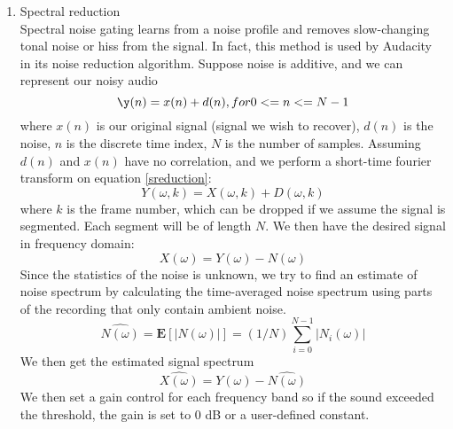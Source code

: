 \begin{enumerate}
	\item Spectral reduction\\
	Spectral noise gating learns from a noise profile and removes slow-changing tonal noise or hiss from the signal. In 
	fact, this method is used by Audacity in its noise reduction algorithm. \cite{audacity}
	Suppose noise is additive, and we can represent our noisy audio 
	\begin{equation} \label{sreduction}
	\y(n) = x(n) + d(n), for 0 <= n <= N-1 
	\end{equation}
	where $x(n)$ is our original signal (signal we wish to recover), $d(n)$ is the noise, $n$ is the discrete time index,
	$N$ is the number of samples. 
	Assuming $d(n)$ and $x(n)$ have no correlation, and we perform a short-time fourier transform on equation \ref{sreduction}:
	\[Y(\omega,k)= X(\omega,k) + D(\omega,k)\]
	where $k$ is the frame number, which can be dropped if we assume the signal is segmented. Each segment will be of
	length $N$. We then have the desired signal in frequency domain:
	\[X(\omega) = Y(\omega) - N(\omega)\]
	Since the statistics of the noise is unknown, we try to find an estimate of noise spectrum by calculating the time-averaged
	noise spectrum using parts of the recording that only contain ambient noise. \cite{reductionmanual}
	\[\hat{N(\omega)} = \textbf{E}[|N(\omega)|] = (1/N)\sum_{i=0}^{N-1}|N_i(\omega)|\]
	We then get the estimated signal spectrum
	\[\hat{X(\omega)} = Y(\omega) - \hat{N(\omega)}\]
	We then set a gain control for each frequency band so if the sound exceeded the threshold, the gain is set to 0 dB or a user-defined
	constant.
\end{enumerate}
